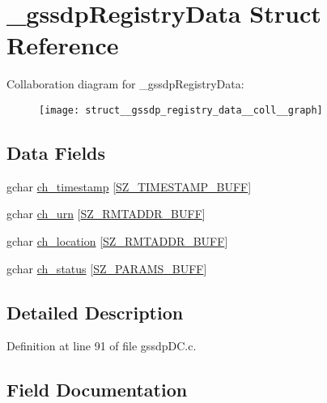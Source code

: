 \hypertarget{struct__gssdp_registry_data}{}\section{\+\_\+gssdp\+Registry\+Data Struct Reference}
\label{struct__gssdp_registry_data}


Collaboration diagram for \+\_\+gssdp\+Registry\+Data\+:
\nopagebreak
\begin{figure}[H]
\begin{center}
\leavevmode
\texttt{[image: struct\_\_gssdp\_registry\_data\_\_coll\_\_graph]}
\end{center}
\end{figure}
\subsection*{Data Fields}
\begin{DoxyCompactItemize}
\item 
gchar \hyperlink{struct__gssdp_registry_data_a97c1fccf55465d4de2168be0d70e2707}{ch\+\_\+timestamp} \mbox{[}\hyperlink{gtk_d_s_8c_ac08ad1b127f1c9743c5592ffb796423f}{S\+Z\+\_\+\+T\+I\+M\+E\+S\+T\+A\+M\+P\+\_\+\+B\+U\+F\+F}\mbox{]}
\item 
gchar \hyperlink{struct__gssdp_registry_data_a57a14b78092cbef8cf6dfa56cffa03db}{ch\+\_\+urn} \mbox{[}\hyperlink{gtk_d_s_8c_a152ca8fa1a2eac39d1badafb6c6cef8c}{S\+Z\+\_\+\+R\+M\+T\+A\+D\+D\+R\+\_\+\+B\+U\+F\+F}\mbox{]}
\item 
gchar \hyperlink{struct__gssdp_registry_data_ac1ca256d22c387e9ef968fb8413d7796}{ch\+\_\+location} \mbox{[}\hyperlink{gtk_d_s_8c_a152ca8fa1a2eac39d1badafb6c6cef8c}{S\+Z\+\_\+\+R\+M\+T\+A\+D\+D\+R\+\_\+\+B\+U\+F\+F}\mbox{]}
\item 
gchar \hyperlink{struct__gssdp_registry_data_a92d851353d8779ad1c5dd4e540a956e5}{ch\+\_\+status} \mbox{[}\hyperlink{gtk_d_s_8c_ac21e8a77d073e7a5383c92bb485992c8}{S\+Z\+\_\+\+P\+A\+R\+A\+M\+S\+\_\+\+B\+U\+F\+F}\mbox{]}
\end{DoxyCompactItemize}


\subsection{Detailed Description}


Definition at line 91 of file gssdp\+D\+C.\+c.



\subsection{Field Documentation}
\hypertarget{struct__gssdp_registry_data_ac1ca256d22c387e9ef968fb8413d7796}{}
